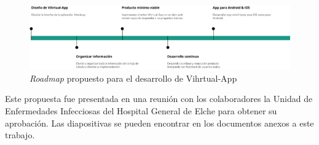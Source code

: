 \begin{figure}[htbp]
\centering
\includegraphics[scale=0.4]{../images/roadmap.png} 
\caption{\textit{Roadmap} propuesto para el desarrollo de Vihrtual-App}
\label{fig:roadmap desarrollo}
\end{figure}

Este propuesta fue presentada en una reunión con los colaboradores la Unidad de Enfermedades Infecciosas del Hospital General de Elche para obtener su aprobación. Las diapositivas se pueden encontrar en los documentos anexos a este trabajo.\\